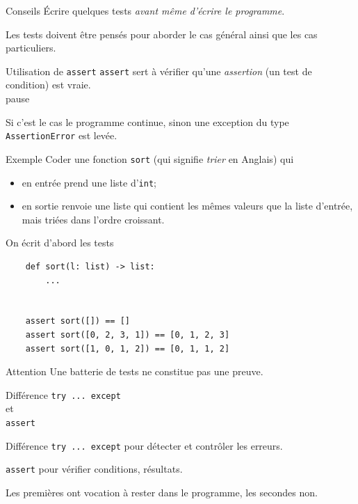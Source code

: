 \documentclass[10pt]{nsibeamer}
\begin{document}
\begin{frame}[fragile]{Conseils}\pause
    Écrire quelques tests \textit{avant même d'écrire le programme}.\\\CurrentFilePathUsed
    
    Les tests doivent être pensés pour aborder le cas général ainsi que les cas particuliers.
\end{frame}

\begin{frame}[fragile]{Utilisation de \texttt{assert}}\pause
    \texttt{assert} sert à vérifier qu'une \textit{assertion} (un test de condition) est vraie.\\pause
    
    Si c'est le cas le programme continue, sinon une exception du type \texttt{AssertionError} est levée.
    
\end{frame}

\begin{frame}[fragile]{Exemple}\pause
    Coder une fonction \texttt{sort} (qui signifie \textit{trier} en Anglais) qui     
    \begin{itemize}
        \item   en entrée prend une liste d'\texttt{int};
        \item   en sortie renvoie une liste qui contient les mêmes valeurs que la liste d'entrée, mais triées dans l'ordre croissant.
    \end{itemize}
\end{frame}

\begin{frame}[fragile]{On écrit d'abord les tests}\pause
    
    \begin{verbatim}
    def sort(l: list) -> list:
        ...


    assert sort([]) == []
    assert sort([0, 2, 3, 1]) == [0, 1, 2, 3]
    assert sort([1, 0, 1, 2]) == [0, 1, 1, 2]
    \end{verbatim}
\end{frame}

\begin{frame}[fragile]{Attention}
    Une batterie de tests ne constitue pas une preuve.
\end{frame}

\begin{frame}[fragile]
    Différence \texttt{try ... except}\\
    et\\
    \texttt{assert}  
\end{frame}
\begin{frame}[fragile]{Différence}\pause
    \texttt{try ... except} pour détecter et contrôler les erreurs.\\\pause
    
    \texttt{assert} pour vérifier conditions, résultats.\\\pause

    Les premières ont vocation à rester dans le programme, les secondes non.
\end{frame}
\end{document}
